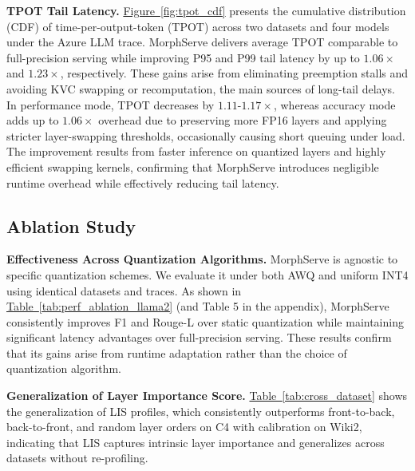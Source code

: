 \documentclass{article}
\newcommand{\system}{{MorphServe}\xspace}
\begin{document}
{\textbf{TPOT Tail Latency.}
\hyperref[fig:tpot_cdf]{Figure~\ref{fig:tpot_cdf}} presents the cumulative distribution (CDF) of
time-per-output-token (TPOT) across two datasets and four models under the Azure LLM trace.
{\system} delivers average TPOT comparable to full-precision serving while improving
P95 and P99 tail latency by up to $1.06\times$ and $1.23\times$, respectively.
These gains arise from eliminating preemption stalls and avoiding KVC swapping or recomputation,
the main sources of long-tail delays.
In performance mode, TPOT decreases by $1.11$-$1.17\times$,
whereas accuracy mode adds up to $1.06\times$ overhead due to preserving more FP16 layers
and applying stricter layer-swapping thresholds, occasionally causing short queuing under load.
The improvement results from faster inference on quantized layers and highly efficient
swapping kernels, 
confirming that {\system} introduces negligible runtime overhead while effectively reducing tail latency.



\subsection{Ablation Study}
\textbf{Effectiveness Across Quantization Algorithms.}
{{\system} is agnostic to specific quantization schemes.
We evaluate it under both AWQ and uniform INT4 using identical datasets and traces.
As shown in \hyperref[tab:perf_ablation_llama2]{Table~\ref{tab:perf_ablation_llama2}} (and Table 5 in the appendix),
{\system} consistently improves F1 and Rouge-L over static quantization
while maintaining significant latency advantages over full-precision serving.
These results confirm that its gains arise from runtime adaptation
rather than the choice of quantization algorithm.}

\textbf{Generalization of Layer Importance Score.}
{\hyperref[tab:cross_dataset]{Table~\ref{tab:cross_dataset}} shows the generalization of LIS profiles, which consistently outperforms front-to-back, back-to-front, and random layer orders on C4 with calibration on Wiki2,
indicating that LIS captures intrinsic layer importance and generalizes across datasets without re-profiling.}

}
\end{document}
